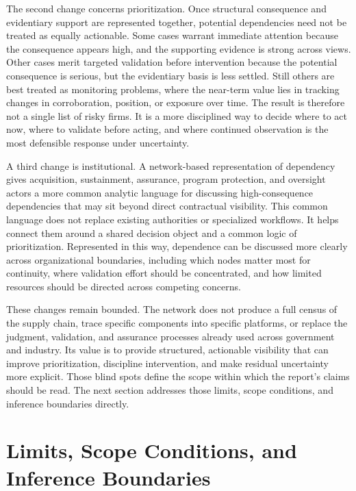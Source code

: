 The second change concerns prioritization. Once structural consequence and evidentiary support are represented together, potential dependencies need not be treated as equally actionable. Some cases warrant immediate attention because the consequence appears high, and the supporting evidence is strong across views. Other cases merit targeted validation before intervention because the potential consequence is serious, but the evidentiary basis is less settled. Still others are best treated as monitoring problems, where the near-term value lies in tracking changes in corroboration, position, or exposure over time. The result is therefore not a single list of risky firms. It is a more disciplined way to decide where to act now, where to validate before acting, and where continued observation is the most defensible response under uncertainty.

A third change is institutional. A network-based representation of dependency gives acquisition, sustainment, assurance, program protection, and oversight actors a more common analytic language for discussing high-consequence dependencies that may sit beyond direct contractual visibility. This common language does not replace existing authorities or specialized workflows. It helps connect them around a shared decision object and a common logic of prioritization. Represented in this way, dependence can be discussed more clearly across organizational boundaries, including which nodes matter most for continuity, where validation effort should be concentrated, and how limited resources should be directed across competing concerns.

These changes remain bounded. The network does not produce a full census of the supply chain, trace specific components into specific platforms, or replace the judgment, validation, and assurance processes already used across government and industry. Its value is to provide structured, actionable visibility that can improve prioritization, discipline intervention, and make residual uncertainty more explicit. Those blind spots define the scope within which the report's claims should be read. The next section addresses those limits, scope conditions, and inference boundaries directly.

\section{Limits, Scope Conditions, and Inference Boundaries}
\label{sec:ch6_limits_scope_conditions_inference_boundaries}

